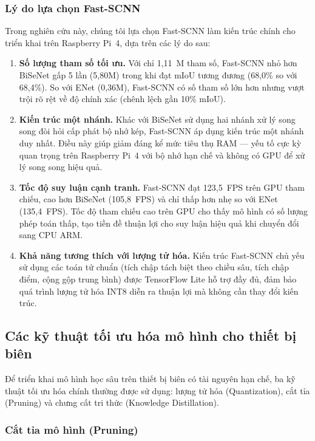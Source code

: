 \documentclass[conference]{IEEEtran}
\begin{document}
\subsubsection{Lý do lựa chọn Fast-SCNN}

Trong nghiên cứu này, chúng tôi lựa chọn Fast-SCNN làm kiến trúc chính cho triển khai trên Raspberry Pi~4, dựa trên các lý do sau:

\begin{enumerate}
  \item \textbf{Số lượng tham số tối ưu.} Với chỉ 1,11~M tham số, Fast-SCNN nhỏ hơn BiSeNet gấp 5 lần (5,80M) trong khi đạt mIoU tương đương (68,0\% so với 68,4\%). So với ENet (0,36M), Fast-SCNN có số tham số lớn hơn nhưng vượt trội rõ rệt về độ chính xác (chênh lệch gần 10\% mIoU).
  \item \textbf{Kiến trúc một nhánh.} Khác với BiSeNet sử dụng hai nhánh xử lý song song đòi hỏi cấp phát bộ nhớ kép, Fast-SCNN áp dụng kiến trúc một nhánh duy nhất. Điều này giúp giảm đáng kể mức tiêu thụ RAM --- yếu tố cực kỳ quan trọng trên Raspberry Pi~4 với bộ nhớ hạn chế và không có GPU để xử lý song song hiệu quả.
  \item \textbf{Tốc độ suy luận cạnh tranh.} Fast-SCNN đạt 123,5~FPS trên GPU tham chiếu, cao hơn BiSeNet (105,8~FPS) và chỉ thấp hơn nhẹ so với ENet (135,4~FPS). Tốc độ tham chiếu cao trên GPU cho thấy mô hình có số lượng phép toán thấp, tạo tiền đề thuận lợi cho suy luận hiệu quả khi chuyển đổi sang CPU ARM.
  \item \textbf{Khả năng tương thích với lượng tử hóa.} Kiến trúc Fast-SCNN chủ yếu sử dụng các toán tử chuẩn (tích chập tách biệt theo chiều sâu, tích chập điểm, cộng gộp trung bình) được TensorFlow Lite hỗ trợ đầy đủ, đảm bảo quá trình lượng tử hóa INT8 diễn ra thuận lợi mà không cần thay đổi kiến trúc.
\end{enumerate}

\subsection{Các kỹ thuật tối ưu hóa mô hình cho thiết bị biên}

Để triển khai mô hình học sâu trên thiết bị biên có tài nguyên hạn chế, ba kỹ thuật tối ưu hóa chính thường được sử dụng: lượng tử hóa (Quantization), cắt tỉa (Pruning) và chưng cất tri thức (Knowledge Distillation).

\subsubsection{Cắt tỉa mô hình (Pruning)}
\end{document}
